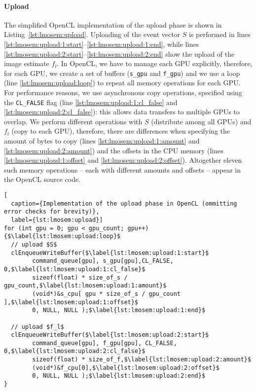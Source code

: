 \paragraph{Upload}
The simplified OpenCL implementation of the upload phase is shown in Listing~\ref{lst:lmosem:upload}.
Uploading of the event vector $S$ is performed in lines \ref{lst:lmosem:upload:1:start}--\ref{lst:lmosem:upload:1:end}, while lines \ref{lst:lmosem:upload:2:start}--\ref{lst:lmosem:upload:2:end} show the upload of the image estimate $f_l$.
In OpenCL, we have to manage each GPU explicitly, therefore, for each GPU, we create a set of buffers (\texttt{s\_gpu} and \texttt{f\_gpu}) and we use a loop (line \ref{lst:lmosem:upload:loop}) to repeat all memory operations for each GPU.
For performance reasons, we use asynchronous copy operations, specified using the \texttt{CL\_FALSE} flag (line \ref{lst:lmosem:upload:1:cl_false} and \ref{lst:lmosem:upload:2:cl_false}): this allows data transfers to multiple GPUs to overlap.
We perform different operations with $S$ (distribute among all GPUs) and $f_l$ (copy to each GPU), therefore, there are differences when specifying the amount of bytes to copy (lines \ref{lst:lmosem:upload:1:amount} and \ref{lst:lmosem:upload:2:amount}) and the offsets in the CPU memory (lines \ref{lst:lmosem:upload:1:offset} and \ref{lst:lmosem:upload:2:offset}).
Altogether eleven such memory operations -- each with different amounts and offsets -- appear in the OpenCL source code.

\begin{lstlisting}[
  caption={Implementation of the upload phase in OpenCL (ommitting error checks for brevity)},
  label={lst:lmosem:upload}]
for (int gpu = 0; gpu < gpu_count; gpu++) {$\label{lst:lmosem:upload:loop}$
  // upload $S$
  clEnqueueWriteBuffer($\label{lst:lmosem:upload:1:start}$
        command_queue[gpu], s_gpu[gpu],CL_FALSE, 0,$\label{lst:lmosem:upload:1:cl_false}$
        sizeof(float) * size_of_s / gpu_count,$\label{lst:lmosem:upload:1:amount}$
        (void*)&s_cpu[ gpu * size_of_s / gpu_count ],$\label{lst:lmosem:upload:1:offset}$
        0, NULL, NULL );$\label{lst:lmosem:upload:1:end}$

  // upload $f_l$
  clEnqueueWriteBuffer($\label{lst:lmosem:upload:2:start}$
        command_queue[gpu], f_gpu[gpu], CL_FALSE, 0,$\label{lst:lmosem:upload:2:cl_false}$
        sizeof(float) * size_of_f,$\label{lst:lmosem:upload:2:amount}$
        (void*)&f_cpu[0],$\label{lst:lmosem:upload:2:offset}$
        0, NULL, NULL );$\label{lst:lmosem:upload:2:end}$
}
\end{lstlisting}

